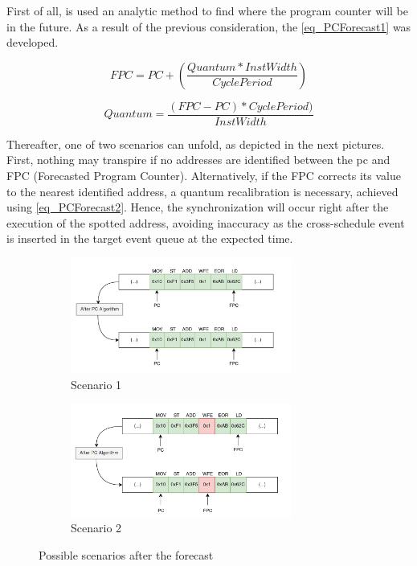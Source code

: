 First of all, is used an analytic method to find where the program counter will be in the future. As a result of the previous consideration, the \autoref{eq_PCForecast1} was developed.

\begin{equation}
    FPC = PC + \left( \frac{Quantum * InstWidth}{CyclePeriod} \right)
    \label{eq_PCForecast1}
\end{equation}

\begin{equation}
    Quantum = \frac{  \left( FPC - PC \right) * CyclePeriod)}{InstWidth} 
    \label{eq_PCForecast2}
\end{equation}

Thereafter, one of two scenarios can unfold, as depicted in the next pictures. First, nothing may transpire if no addresses are identified between the \gls{pc} and FPC (Forecasted Program Counter). Alternatively, if the FPC corrects its value to the nearest identified address, a quantum recalibration is necessary, achieved using \autoref{eq_PCForecast2}. Hence, the synchronization will occur right after the execution of the spotted address, avoiding inaccuracy as the cross-schedule event is inserted in the target event queue at the expected time.

\begin{figure} [H]
\centering
\begin{subfigure}{\textwidth}
    \includegraphics[width=0.8\textwidth]{Images/PCAlgrithm_noCut.png}
    \caption{ Scenario 1 }
    \label{fig:PCAlgrithm_noCut}
\end{subfigure}
\begin{subfigure}{\textwidth}
    \includegraphics[width=0.8\textwidth]{Images/PCAlgrithm_Cut.png}
    \caption{ Scenario 2 }
    \label{fig:PCAlgrithm_Cut}
\end{subfigure}
        
\caption{Possible scenarios after the forecast}
\label{fig:PCAlgorithm_differentScenarios}
\end{figure}

